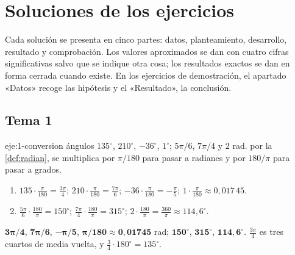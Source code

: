 \chapter{Soluciones de los ejercicios}
\label{ap:soluciones}

Cada solución se presenta en cinco partes: datos, planteamiento, desarrollo, resultado y comprobación. Los valores aproximados se dan con cuatro cifras significativas salvo que se indique otra cosa; los resultados exactos se dan en forma cerrada cuando existe. En los ejercicios de demostración, el apartado «Datos» recoge las hipótesis y el «Resultado», la conclusión.

\section{Tema 1}

\begin{solucion}{eje:1-conversion}
\datos ángulos $135^{\circ}$, $210^{\circ}$, $-36^{\circ}$, $1^{\circ}$; $5\pi/6$, $7\pi/4$ y $2$ rad.
\planteamiento por la \cref{def:radian}, se multiplica por $\pi/180$ para pasar a radianes y por $180/\pi$ para pasar a grados.
\pasos
\begin{enumerate}[label=\arabic*.]
  \item $135\cdot\frac{\pi}{180}=\frac{3\pi}{4}$; \quad $210\cdot\frac{\pi}{180}=\frac{7\pi}{6}$; \quad $-36\cdot\frac{\pi}{180}=-\frac{\pi}{5}$; \quad $1\cdot\frac{\pi}{180}\approx0{,}017\,45$.
  \item $\frac{5\pi}{6}\cdot\frac{180}{\pi}=150^{\circ}$; \quad $\frac{7\pi}{4}\cdot\frac{180}{\pi}=315^{\circ}$; \quad $2\cdot\frac{180}{\pi}=\frac{360}{\pi}\approx114{,}6^{\circ}$.
\end{enumerate}
\resultado $\mathbf{3\pi/4}$, $\mathbf{7\pi/6}$, $\mathbf{-\pi/5}$, $\mathbf{\pi/180\approx0{,}01745}$ rad; $\mathbf{150^{\circ}}$, $\mathbf{315^{\circ}}$, $\mathbf{114{,}6^{\circ}}$.
\comprobacion $\frac{3\pi}{4}$ es tres cuartos de media vuelta, y $\frac34\cdot180^{\circ}=135^{\circ}$.
\end{solucion}

